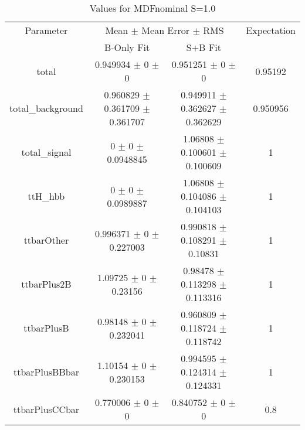 \begin{table}
\centering
\caption{Values for MDFnominal S=1.0}
\begin{tabular}{cccc}
\toprule
Parameter & \multicolumn{2}{c}{Mean $\pm$ Mean Error $\pm$ RMS} & Expectation\\
 & B-Only Fit & S+B Fit & \\
\midrule
total & \num{0.949934} $\pm$ \num{0} $\pm$ \num{0} & \num{0.951251} $\pm$ \num{0} $\pm$ \num{0} & \num{0.95192}\\
total\_background & \num{0.960829} $\pm$ \num{0.361709} $\pm$ \num{0.361707} & \num{0.949911} $\pm$ \num{0.362627} $\pm$ \num{0.362629} & \num{0.950956}\\
total\_signal & \num{0} $\pm$ \num{0} $\pm$ \num{0.0948845} & \num{1.06808} $\pm$ \num{0.100601} $\pm$ \num{0.100609} & \num{1}\\
ttH\_hbb & \num{0} $\pm$ \num{0} $\pm$ \num{0.0989887} & \num{1.06808} $\pm$ \num{0.104086} $\pm$ \num{0.104103} & \num{1}\\
ttbarOther & \num{0.996371} $\pm$ \num{0} $\pm$ \num{0.227003} & \num{0.990818} $\pm$ \num{0.108291} $\pm$ \num{0.10831} & \num{1}\\
ttbarPlus2B & \num{1.09725} $\pm$ \num{0} $\pm$ \num{0.23156} & \num{0.98478} $\pm$ \num{0.113298} $\pm$ \num{0.113316} & \num{1}\\
ttbarPlusB & \num{0.98148} $\pm$ \num{0} $\pm$ \num{0.232041} & \num{0.960809} $\pm$ \num{0.118724} $\pm$ \num{0.118742} & \num{1}\\
ttbarPlusBBbar & \num{1.10154} $\pm$ \num{0} $\pm$ \num{0.230153} & \num{0.994595} $\pm$ \num{0.124314} $\pm$ \num{0.124331} & \num{1}\\
ttbarPlusCCbar & \num{0.770006} $\pm$ \num{0} $\pm$ \num{0} & \num{0.840752} $\pm$ \num{0} $\pm$ \num{0} & \num{0.8}\\
\bottomrule
\end{tabular}
\end{table}